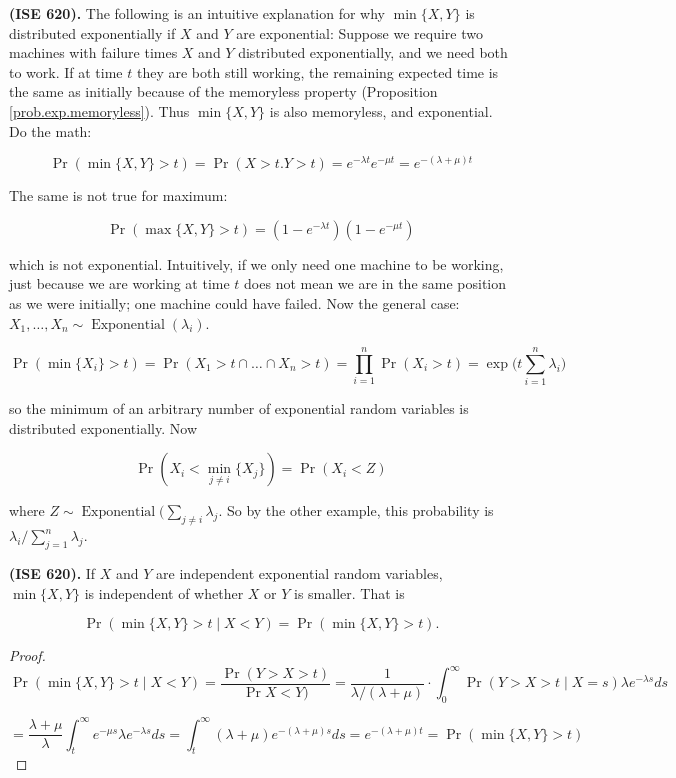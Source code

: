\begin{remark} \textbf{(ISE 620).} The following is an intuitive explanation for why \(\min\{X,Y\}\) is distributed exponentially if \(X\) and \(Y\) are exponential: Suppose we require two machines with failure times \(X\) and \(Y\) distributed exponentially, and we need both to work. If at time \(t\) they are both still working, the remaining expected time is the same as initially because of the memoryless property (Proposition \ref{prob.exp.memoryless}). Thus \(\min\{X,Y\}\) is also memoryless, and exponential. Do the math:

\[
\Pr(\min\{X,Y\} > t) = \Pr(X > t. Y >t) = e^{-\lambda t} e^{-\mu t} = e^{-(\lambda + \mu) t}
\]

The same is not true for maximum:

\[
\Pr(\max\{X,Y\} > t) = (1 - e^{-\lambda t}) (1 - e^{-\mu t}) 
\]

which is not exponential. Intuitively, if we only need one machine to be working, just because we are working at time \(t\) does not mean we are in the same position as we were initially; one machine could have failed. Now the general case: \(X_1, \ldots, X_n \sim \operatorname{Exponential}(\lambda_i)\). 

\[
\Pr(\min\{X_i\} > t) = \Pr(X_1 >t \cap \ldots \cap X_n > t) = \prod_{i=1}^n \Pr(X_i > t) = \exp \bigg( t\sum_{i=1}^n \lambda_i \bigg) 
\]

so the minimum of an arbitrary number of exponential random variables is distributed exponentially. Now

\[
\Pr(X_i < \min_{j \neq i} \{X_j\}) = \Pr(X_i < Z)
\]

where \(Z \sim \operatorname{Exponential}(\sum_{j \neq i} \lambda_j\). So by the other example, this probability is \(\lambda_i / \sum_{j=1}^n \lambda_j\).

\end{remark}

\begin{proposition} \textbf{(ISE 620).} If \(X\) and \(Y\) are independent exponential random variables, \(\min\{X,Y\}\) is independent of whether \(X\) or \(Y\) is smaller. That is 

\[
\Pr( \min\{X,Y\} > t \mid X < Y) = \Pr(\min\{X,Y\} > t).
\]

\end{proposition}

\begin{proof}

\[
\Pr( \min\{X,Y\} > t \mid X < Y) = \frac{\Pr( Y > X > t)}{\Pr X  < Y)}  = \frac{1}{\lambda/(\lambda + \mu)} \cdot \int_0^\infty \Pr(Y > X > t \mid X = s) \lambda e^{-\lambda s} ds 
\]

\[
= \frac{\lambda + \mu}{\lambda} \int_t^\infty e^{-\mu s} \lambda e^{-\lambda s} ds = \int_t^\infty (\lambda + \mu) e^{-(\lambda + \mu)s} ds = e^{-(\lambda + \mu)t} = \Pr(\min\{X,Y\} > t)
\]

\end{proof}

